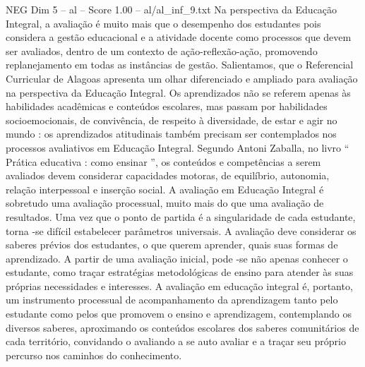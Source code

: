 \begin{textsample}{NEG Dim 5 – al – Score 1.00 – al/al\_inf\_9.txt}  \label{ex:f5_neg_250}
Na perspectiva da Educação Integral, a avaliação é muito mais que o desempenho dos estudantes pois considera a gestão educacional e a atividade docente como processos que devem ser avaliados, dentro de um contexto de ação-reflexão-ação, promovendo replanejamento em todas as instâncias de gestão.
Salientamos, que o Referencial Curricular de Alagoas apresenta um olhar diferenciado e ampliado para avaliação na perspectiva da Educação Integral.
Os aprendizados não se referem apenas às habilidades acadêmicas e conteúdos escolares, mas passam por habilidades socioemocionais, de convivência, de respeito à diversidade, de estar e agir no mundo : os aprendizados atitudinais também precisam ser contemplados nos processos avaliativos em Educação Integral.
Segundo Antoni Zaballa, no livro “ Prática educativa : como ensinar ”, os conteúdos e competências a serem avaliados devem considerar capacidades motoras, de equilíbrio, autonomia, relação interpessoal e inserção social.
A avaliação em Educação Integral é sobretudo uma avaliação processual, muito mais do que uma avaliação de resultados.
Uma vez que o ponto de partida é a singularidade de cada estudante, torna -se difícil estabelecer parâmetros universais.
A avaliação deve considerar os saberes prévios dos estudantes, o que querem aprender, quais suas formas de aprendizado.
A partir de uma avaliação inicial, pode -se não apenas conhecer o estudante, como traçar estratégias metodológicas de ensino para atender às suas próprias necessidades e interesses.
A avaliação em educação integral é, portanto, um instrumento processual de acompanhamento da aprendizagem tanto pelo estudante como pelos que promovem o ensino e aprendizagem, contemplando os diversos saberes, aproximando os conteúdos escolares dos saberes comunitários de cada território, convidando o avaliando a se auto avaliar e a traçar seu próprio percurso nos caminhos do conhecimento.

\end{textsample}
